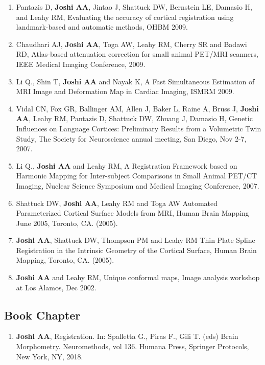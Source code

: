 \documentclass[overlapped,line,letterpaper]{res}
\begin{document}
\begin{resume}
\begin{enumerate}
    \item Pantazis D, \textbf{Joshi AA}, Jintao J, Shattuck DW, Bernstein LE, Damasio H, and Leahy RM, {Evaluating the accuracy of cortical registration using landmark-based and automatic methods}, OHBM 2009.

    \item Chaudhari AJ, \textbf{Joshi AA}, Toga AW, Leahy RM, Cherry SR and Badawi RD, {Atlas-based attenuation correction for small animal PET/MRI scanners}, IEEE Medical Imaging Conference, 2009.

    \item Li Q., Shin T, \textbf{Joshi AA} and Nayak K, {A Fast Simultaneous Estimation of MRI Image and Deformation Map in Cardiac Imaging}, ISMRM 2009. 

    \item Vidal CN, Fox GR, Ballinger AM, Allen J, Baker L, Raine A, Bruss J, \textbf{Joshi AA}, Leahy RM, Pantazis D, Shattuck DW, Zhuang J, Damasio H, {Genetic Influences on Language Cortices: Preliminary Results from a Volumetric Twin Study}, The Society for Neuroscience annual meeting, San Diego, Nov 2-7, 2007.

    \item Li Q., \textbf{Joshi AA} and Leahy RM, {A Registration Framework based on Harmonic Mapping for Inter-subject Comparisons in Small Animal {PET/CT} Imaging}, Nuclear Science Symposium and Medical Imaging Conference, 2007.

    \item Shattuck DW, \textbf{Joshi AA}, Leahy RM and Toga AW {Automated Parameterized Cortical Surface Models from MRI}, Human Brain Mapping June 2005, Toronto, CA. (2005).

    \item \textbf{Joshi AA}, Shattuck DW, Thompson PM and Leahy RM {Thin Plate Spline Registration in the Intrinsic Geometry of the Cortical Surface},  Human Brain Mapping, Toronto, CA. (2005).

    \item \textbf{Joshi AA} and Leahy RM, {Unique conformal maps},  Image analysis workshop at Los Alamos, Dec 2002. 
\end{enumerate}


\subsection{Book Chapter}
\begin{enumerate}
    \item \textbf{Joshi AA},  Registration. In: Spalletta G., Piras F., Gili T. (eds) Brain Morphometry. Neuromethods, vol 136. Humana Press, Springer Protocols, New York, NY, 2018.
\end{enumerate}



\end{resume}
\end{document}

